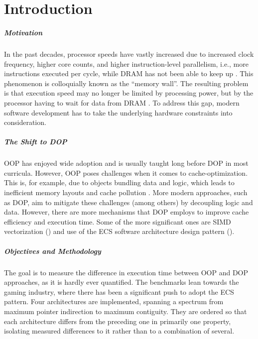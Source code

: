 \cleardoubleoddpage
\chapter{Introduction}
\label{sec:introduction}

\paragraph{Motivation}
\label{sec:introduction:motivation}
In the past decades, processor speeds have vastly increased due to increased clock frequency, higher core counts, and higher instruction-level parallelism, i.e., more instructions executed per cycle, while DRAM has not been able to keep up \cite{hennessy2011computer}. This phenomenon is colloquially known as the ``memory wall''. The resulting problem is that execution speed may no longer be limited by processing power, but by the processor having to wait for data from DRAM \cite{drepper2007every}. To address this gap, modern software development has to take the underlying hardware constraints into consideration. 

\paragraph{The Shift to DOP}
\label{sec:introduction:shift-dop}
\ac{OOP} has enjoyed wide adoption and is usually taught long before \ac{DOP} in most curricula. However, \ac{OOP} poses challenges when it comes to cache-optimization. This is, for example, due to objects bundling data and logic, which leads to inefficient memory layouts and cache pollution \cite{drepper2007every}. More modern approaches, such as \ac{DOP}, aim to  mitigate these challenges (among others) by decoupling logic and data. However, there are more mechanisms that \ac{DOP} employs to improve cache efficiency and execution time. Some of the more significant ones are \ac{SIMD} vectorization () and use of the \ac{ECS} software architecture design pattern ().

\paragraph{Objectives and Methodology}
\label{sec:introduction:objectives}
The goal is to measure the difference in execution time between \ac{OOP} and \ac{DOP} approaches, as it is hardly ever quantified. The benchmarks lean towards the gaming industry, where there has been a significant push to adopt the \ac{ECS} pattern. Four architectures are implemented, spanning a spectrum from maximum pointer indirection to maximum contiguity. They are ordered so that each architecture differs from the preceding one in primarily one property, isolating measured differences to it rather than to a combination of several.

